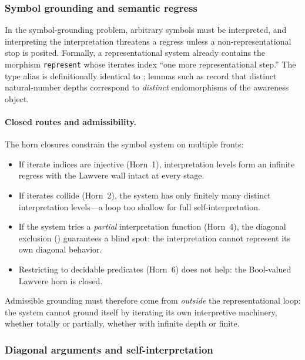 \documentclass[11pt]{article}
\begin{document}
\subsubsection{Symbol grounding and semantic regress}

In the symbol-grounding problem, arbitrary symbols must be interpreted, and
interpreting the interpretation threatens a regress unless a non-representational
stop is posited. Formally, a representational system already contains the morphism
\texttt{represent} whose iterates index ``one more representational step.'' The
type alias  is definitionally identical to
; lemmas such as
 record that distinct
natural-number depths correspond to \emph{distinct} endomorphisms of the
awareness object.

\paragraph{Closed routes and admissibility.}
The horn closures constrain the symbol system on multiple fronts:
\begin{itemize}[leftmargin=1.5em,itemsep=0pt,topsep=0.3ex,parsep=0pt]
\item If iterate indices are injective (Horn~1), interpretation levels
  form an infinite regress with the Lawvere wall intact at every stage.
\item If iterates collide (Horn~2), the system has only finitely many
  distinct interpretation levels---a loop too shallow for full
  self-interpretation.
\item If the system tries a \emph{partial} interpretation function
  (Horn~4), the diagonal exclusion
  () guarantees a blind
  spot: the interpretation cannot represent its own diagonal behavior.
\item Restricting to decidable predicates (Horn~6) does not help:
  the $\mathrm{Bool}$-valued Lawvere horn is closed.
\end{itemize}
Admissible grounding must therefore come from \emph{outside} the
representational loop: the system cannot ground itself by iterating
its own interpretive machinery, whether totally or partially, whether
with infinite depth or finite.

\subsubsection{Diagonal arguments and self-interpretation}
\end{document}
